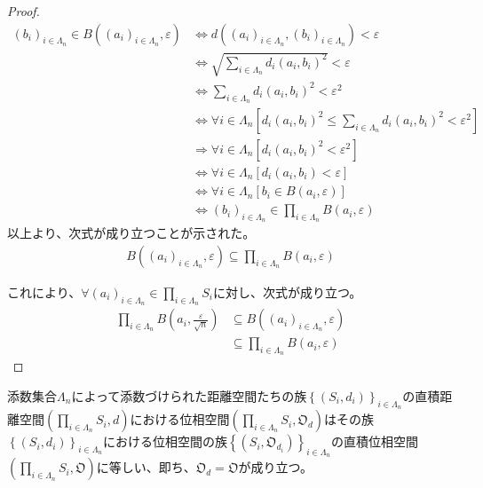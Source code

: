 \documentclass[dvipdfmx]{jsarticle}
\begin{document}
\begin{proof}
\begin{align*}
\left( b_{i} \right)_{i \in \varLambda_{n}} \in B\left( \left( a_{i} \right)_{i \in \varLambda_{n}},\varepsilon \right) &\Leftrightarrow d\left( \left( a_{i} \right)_{i \in \varLambda_{n}},\left( b_{i} \right)_{i \in \varLambda_{n}} \right) < \varepsilon\\
&\Leftrightarrow \sqrt{\sum_{i \in \varLambda_{n}} {d_{i}\left( a_{i},b_{i} \right)}^{2}} < \varepsilon\\
&\Leftrightarrow \sum_{i \in \varLambda_{n}} {d_{i}\left( a_{i},b_{i} \right)}^{2} < \varepsilon^{2}\\
&\Leftrightarrow \forall i \in \varLambda_{n}\left[ {d_{i}\left( a_{i},b_{i} \right)}^{2} \leq \sum_{i \in \varLambda_{n}} {d_{i}\left( a_{i},b_{i} \right)}^{2} < \varepsilon^{2} \right]\\
&\Rightarrow \forall i \in \varLambda_{n}\left[ {d_{i}\left( a_{i},b_{i} \right)}^{2} < \varepsilon^{2} \right]\\
&\Leftrightarrow \forall i \in \varLambda_{n}\left[ d_{i}\left( a_{i},b_{i} \right) < \varepsilon \right]\\
&\Leftrightarrow \forall i \in \varLambda_{n}\left[ b_{i} \in B\left( a_{i},\varepsilon \right) \right]\\
&\Leftrightarrow \left( b_{i} \right)_{i \in \varLambda_{n}} \in \prod_{i \in \varLambda_{n}} {B\left( a_{i},\varepsilon \right)}
\end{align*}
以上より、次式が成り立つことが示された。
\begin{align*}
B\left( \left( a_{i} \right)_{i \in \varLambda_{n}},\varepsilon \right) \subseteq \prod_{i \in \varLambda_{n}} {B\left( a_{i},\varepsilon \right)}
\end{align*}\par
これにより、$\forall\left( a_{i} \right)_{i \in \varLambda_{n}} \in \prod_{i \in \varLambda_{n}} S_{i}$に対し、次式が成り立つ。
\begin{align*}
\prod_{i \in \varLambda_{n}} {B\left( a_{i},\frac{\varepsilon}{\sqrt{n}} \right)} &\subseteq B\left( \left( a_{i} \right)_{i \in \varLambda_{n}},\varepsilon \right)\\
&\subseteq \prod_{i \in \varLambda_{n}} {B\left( a_{i},\varepsilon \right)}
\end{align*}
\end{proof}
\begin{thm}\label{8.2.1.23}
添数集合$\varLambda_{n}$によって添数づけられた距離空間たちの族$\left\{ \left( S_{i},d_{i} \right) \right\}_{i \in \varLambda_{n}}$の直積距離空間$\left( \prod_{i \in \varLambda_{n}} S_{i},d \right)$における位相空間$\left( \prod_{i \in \varLambda_{n}} S_{i},\mathfrak{O}_{d} \right)$はその族$\left\{ \left( S_{i},d_{i} \right) \right\}_{i \in \varLambda_{n}}$における位相空間の族$\left\{ \left( S_{i},\mathfrak{O}_{d_{i}} \right) \right\}_{i \in \varLambda_{n}}$の直積位相空間$\left( \prod_{i \in \varLambda_{n}} S_{i},\mathfrak{O} \right)$に等しい、即ち、$\mathfrak{O}_{d} = \mathfrak{O}$が成り立つ。
\end{thm}
\end{document}
